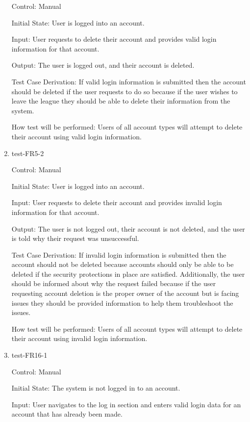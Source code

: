\documentclass[12pt, titlepage]{article}
\begin{document}
\begin{enumerate}
  Control: Manual
           
  Initial State: User is logged into an account.
           
  Input: User requests to delete their account and provides valid login
  information for that account.
           
  Output: The user is logged out, and their account is deleted.
 
  Test Case Derivation: If valid login information is submitted then the
  account should be deleted if the user requests to do so because if the user
  wishes to leave the league they should be able to delete their information
  from the system.
 
  How test will be performed: Users of all account types will attempt to delete
  their account using valid login information.

  \item{test-FR5-2\\}

  Control: Manual
           
  Initial State: User is logged into an account.
           
  Input: User requests to delete their account and provides invalid login
  information for that account.
           
  Output: The user is not logged out, their account is not deleted, and
  the user is told why their request was unsuccessful.
 
  Test Case Derivation: If invalid login information is submitted then the
  account should not be deleted because accounts should only be able to be
  deleted if the security protections in place are satisfied. Additionally,
  the user should be informed about why the request failed because if the
  user requesting account deletion is the proper owner of the account but is
  facing issues they should be provided information to help them troubleshoot
  the issues.
 
  How test will be performed: Users of all account types will attempt to delete
  their account using invalid login information.

  \item{test-FR16-1\\}

  Control: Manual
            
  Initial State: The system is not logged in to an account.
            
  Input: User navigates to the log in section and enters valid login data for
  an account that has already been made.
            

\end{enumerate}
\end{document}
